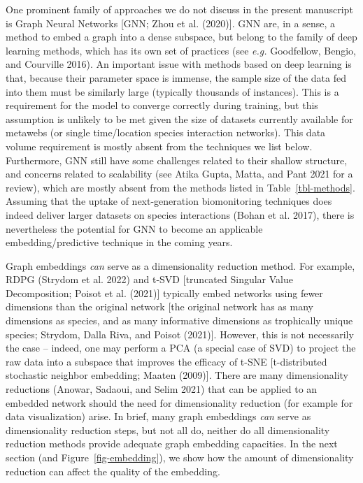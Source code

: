 \documentclass[
  letterpaper,
  DIV=11,
  numbers=noendperiod]{scrartcl}
\begin{document}
\begin{tcolorbox}[enhanced jigsaw, colbacktitle=quarto-callout-note-color!10!white, title=\textcolor{quarto-callout-note-color}{\faInfo}\hspace{0.5em}{Box 1 - Graph Neural Networks}, colback=white, rightrule=.15mm, coltitle=black, colframe=quarto-callout-note-color-frame, bottomrule=.15mm, opacityback=0, breakable, bottomtitle=1mm, titlerule=0mm, toptitle=1mm, arc=.35mm, toprule=.15mm, leftrule=.75mm, left=2mm, opacitybacktitle=0.6]

One prominent family of approaches we do not discuss in the present
manuscript is Graph Neural Networks {[}GNN; Zhou et al. (2020){]}. GNN
are, in a sense, a method to embed a graph into a dense subspace, but
belong to the family of deep learning methods, which has its own set of
practices (see \emph{e.g.} Goodfellow, Bengio, and Courville 2016). An
important issue with methods based on deep learning is that, because
their parameter space is immense, the sample size of the data fed into
them must be similarly large (typically thousands of instances). This is
a requirement for the model to converge correctly during training, but
this assumption is unlikely to be met given the size of datasets
currently available for metawebs (or single time/location species
interaction networks). This data volume requirement is mostly absent
from the techniques we list below. Furthermore, GNN still have some
challenges related to their shallow structure, and concerns related to
scalability (see Atika Gupta, Matta, and Pant 2021 for a review), which
are mostly absent from the methods listed in Table~\ref{tbl-methods}.
Assuming that the uptake of next-generation biomonitoring techniques
does indeed deliver larger datasets on species interactions (Bohan et
al. 2017), there is nevertheless the potential for GNN to become an
applicable embedding/predictive technique in the coming years.

\end{tcolorbox}

Graph embeddings \emph{can} serve as a dimensionality reduction method.
For example, RDPG (Strydom et al. 2022) and t-SVD {[}truncated Singular
Value Decomposition; Poisot et al. (2021){]} typically embed networks
using fewer dimensions than the original network {[}the original network
has as many dimensions as species, and as many informative dimensions as
trophically unique species; Strydom, Dalla Riva, and Poisot (2021){]}.
However, this is not necessarily the case -- indeed, one may perform a
PCA (a special case of SVD) to project the raw data into a subspace that
improves the efficacy of t-SNE {[}t-distributed stochastic neighbor
embedding; Maaten (2009){]}. There are many dimensionality reductions
(Anowar, Sadaoui, and Selim 2021) that can be applied to an embedded
network should the need for dimensionality reduction (for example for
data visualization) arise. In brief, many graph embeddings \emph{can}
serve as dimensionality reduction steps, but not all do, neither do all
dimensionality reduction methods provide adequate graph embedding
capacities. In the next section (and Figure~\ref{fig-embedding}), we
show how the amount of dimensionality reduction can affect the quality
of the embedding.
\end{document}
